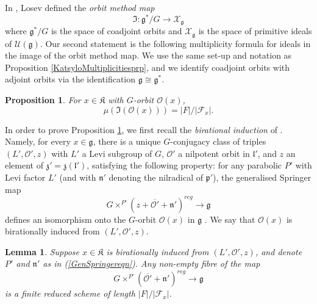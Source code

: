 \documentclass{amsart}
\newtheorem{lemma}[theorem]{Lemma}
\newtheorem{proposition}[theorem]{Proposition}
\theoremstyle{remark}
\numberwithin{theorem}{section}
\numberwithin{equation}{section}
\begin{document}
In \cite{Losev4}, Losev defined the \emph{orbit method map}
\begin{equation}\label{OrbitMethodeqn}
    \mathfrak{I}:\mathfrak{g}^*/G \rightarrow \mathscr X_\mathfrak{g}
\end{equation}
where $\mathfrak{g}^*/G$ is the space of coadjoint orbits and $\mathscr X_{\mathfrak{g}}$ is the space of primitive ideals of $\mathcal U(\mathfrak{g})$. Our second statement is the following multiplicity formula for ideals in the image of the orbit method map. We use the same set-up and notation as Proposition \ref{KatsyloMultiplicitiesprp}, and we identify coadjoint orbits with adjoint orbits via the identification $\mathfrak{g} \cong \mathfrak{g}^*$.

\begin{proposition}\label{OrbitMethodMultprp}
    For $x \in \mathfrak{K}$ with $G$-orbit $\mathcal O(x)$,
    \begin{equation}\label{OrbitMethodMulteqn}
        \mu(\mathfrak{I}(\mathcal O(x))) = |F|/|\mathcal F_x|.
    \end{equation}
\end{proposition}

In order to prove Proposition \ref{OrbitMethodMultprp}, we first recall the \emph{birational induction} of \cite[Definition 1.2]{Losev4}. Namely, for every $x \in \mathfrak{g}$, there is a unique $G$-conjugacy class of triples $(L',\mathcal O', z)$ with $L'$ a Levi subgroup of $G$, $\mathcal O'$ a nilpotent orbit in $\mathfrak{l}'$, and $z$ an element of $\mathfrak{z}' = \mathfrak{z}(\mathfrak{l'})$, satisfying the following property: for any parabolic $P'$ with Levi factor $L'$ (and with $\mathfrak{n}'$ denoting the nilradical of $\mathfrak{p}'$), the generalised Springer map
\begin{equation}\label{GenSpringereqn}
    G \times^{P'}(z+\overline{\mathcal O'} + \mathfrak{n}')^{reg} \rightarrow \mathfrak{g}
\end{equation}
defines an isomorphism onto the $G$-orbit $\mathcal O(x)$ in $\mathfrak{g}$ \cite[Theorem 4.4]{Losev4}. We say that $\mathcal O(x)$ is birationally induced from $(L',\mathcal O', z)$.

\begin{lemma}\label{BirIndlem}
  Suppose $x \in \mathfrak{K}$ is birationally induced from $(L',\mathcal O',z)$, and denote $P'$ and $\mathfrak{n}'$ as in (\ref{GenSpringereqn}). Any non-empty fibre of the map
  \begin{equation}\label{BirIndeqn}
    G \times^{P'}(\overline{\mathcal O'} + \mathfrak{n}')^{reg} \rightarrow \mathfrak{g}
    \end{equation}
    is a finite reduced scheme of length $|F|/|\mathcal F_x|$.
\end{lemma}
\end{document}

